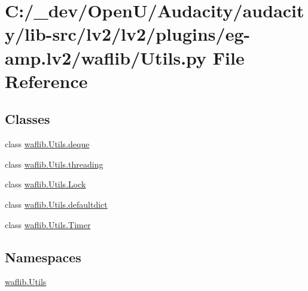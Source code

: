 \hypertarget{lv2_2plugins_2eg-amp_8lv2_2waflib_2_utils_8py}{}\section{C\+:/\+\_\+dev/\+Open\+U/\+Audacity/audacity/lib-\/src/lv2/lv2/plugins/eg-\/amp.lv2/waflib/\+Utils.py File Reference}
\label{lv2_2plugins_2eg-amp_8lv2_2waflib_2_utils_8py}
\subsection*{Classes}
\begin{DoxyCompactItemize}
\item 
class \hyperlink{classwaflib_1_1_utils_1_1deque}{waflib.\+Utils.\+deque}
\item 
class \hyperlink{classwaflib_1_1_utils_1_1threading}{waflib.\+Utils.\+threading}
\item 
class \hyperlink{classwaflib_1_1_utils_1_1_lock}{waflib.\+Utils.\+Lock}
\item 
class \hyperlink{classwaflib_1_1_utils_1_1defaultdict}{waflib.\+Utils.\+defaultdict}
\item 
class \hyperlink{classwaflib_1_1_utils_1_1_timer}{waflib.\+Utils.\+Timer}
\end{DoxyCompactItemize}
\subsection*{Namespaces}
\begin{DoxyCompactItemize}
\item 
 \hyperlink{namespacewaflib_1_1_utils}{waflib.\+Utils}
\end{DoxyCompactItemize}
